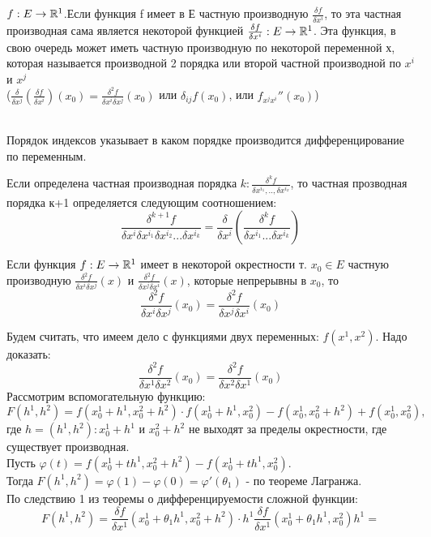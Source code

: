 \begin{opred}
	$f:E\to\mathbb{R}^1$.Если функция f имеет в Е частную производную $ \frac{\delta f}{\delta x^i}$, то эта частная производная сама является некоторой функцией $ \frac{\delta f}{\delta x^i}:E\to\mathbb{R}^1$. Эта функция, в свою очередь может иметь частную производную по некоторой переменной х, которая называется производной 2 порядка или второй частной производной по $x^i$ и $x^j$
	\\
	($\frac{\delta}{\delta x^j}(\frac{\delta f}{\delta x^i})(x_0) = \frac{\delta^2 f}{\delta x^i \delta x^j}(x_0)$ или $\delta_{ij}f(x_0)$, или $f_{x^j x^i}''(x_0)$)
\end{opred}
\\
Порядок индексов указывает в каком порядке производится дифференцирование по переменным.
\begin{opred}
	Если определена частная производная порядка $k: \frac{\delta^k f}{\delta x^{i_1},..,\delta x^{i_x}}$, то частная прозводная порядка к+1 определяется следующим соотношением:
	$$
	\frac{\delta^{k+1}f}{\delta x^i \delta x^{i_1} \delta x^{i_2}...\delta x^{i_k}}=\frac{\delta}{\delta x^i}(\frac{\delta^k f}{\delta x^{i_1}...\delta x^{i_k}})
	$$
\end{opred}
	
	\begin{teorema}
		Если функция $f:E\to\mathbb{R}^1$ имеет в некоторой окрестности т. $x_0\in E$ частную производную $\frac{\delta^2 f}{\delta x^i \delta x^j}(x)$ и $\frac{\delta^2 f}{\delta x^j \delta x^i}(x)$, которые непрерывны в $x_0$, то
		$$
		\frac{\delta^2 f}{\delta x^i \delta x^j}(x_0)=\frac{\delta^2 f}{\delta x^j \delta x^i}(x_0)
		$$
	\end{teorema}
	\dokvo
	Будем считать, что имеем дело с функциями двух переменных: $f(x^1,x^2).$ Надо доказать:
	$$
	\frac{\delta^2 f}{\delta x^1 \delta x^2}(x_0)=\frac{\delta^2 f}{\delta x^2 \delta x^1}(x_0)
	$$
	Рассмотрим вспомогательную функцию:
	$$
	F(h^1,h^2)=f(x_0^1+h^1,x_0^2+h^2)\cdot f(x_0^1+h^1,x_0^2)-f(x_0^1,x_0^2+h^2)+f(x_0^1,x_0^2),
	$$
	где $h=(h^1,h^2):x_0^1+h^1$ и $x_0^2+h^2$ не выходят за пределы окрестности, где существует производная.
	\\
	Пусть $\varphi(t)=f(x_0^1+th^1,x_0^2+h^2)-f(x_0^1+th^1,x_0^2).$
	\\
	Тогда $F(h^1,h^2)=\varphi(1)-\varphi(0)=\varphi'(\theta_1)$ - по теореме Лагранжа.
	\\
	По следствию 1 из теоремы о дифференцируемости сложной функции:
	$$
	F(h^1,h^2)=\frac{\delta f}{\delta x^1}(x_0^1+\theta_1 h^1,x_0^2+h^2)\cdot h^1\frac{\delta f}{\delta x^1}(x_0^1+\theta_1 h^1, x_0^2)h^1 =
	$$
	
